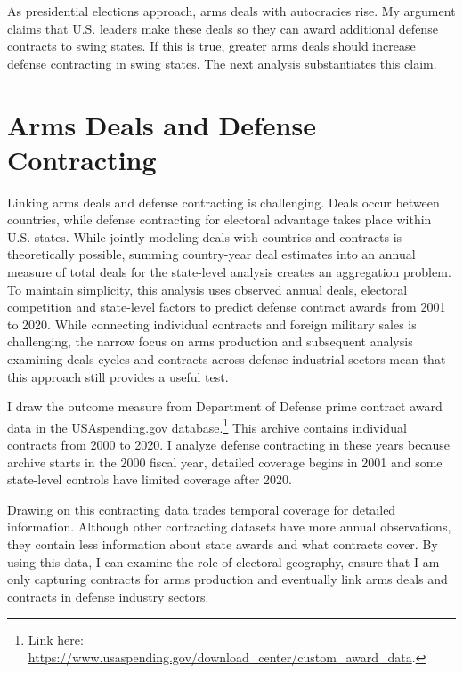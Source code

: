\documentclass[12pt]{article}
\begin{document}
As presidential elections approach, arms deals with autocracies rise. 
My argument claims that U.S. leaders make these deals so they can award additional defense contracts to swing states. 
If this is true, greater arms deals should increase defense contracting in swing states. 
The next analysis substantiates this claim.


\section{Arms Deals and Defense Contracting}


Linking arms deals and defense contracting is challenging. 
Deals occur between countries, while defense contracting for electoral advantage takes place within U.S. states.
While jointly modeling deals with countries and contracts is theoretically possible, summing country-year deal estimates into an annual measure of total deals for the state-level analysis creates an aggregation problem. %
To maintain simplicity, this analysis uses observed annual deals, electoral competition and state-level factors to predict defense contract awards from 2001 to 2020. 
While connecting individual contracts and foreign military sales is challenging, the narrow focus on arms production and subsequent analysis examining deals cycles and contracts across defense industrial sectors mean that this approach still provides a useful test. 



I draw the outcome measure from Department of Defense prime contract award data in the USAspending.gov database.\footnote{Link here: \url{https://www.usaspending.gov/download_center/custom_award_data}.} 
This archive contains individual contracts from 2000 to 2020.
I analyze defense contracting in these years because archive starts in the 2000 fiscal year, detailed coverage begins in 2001 and some state-level controls have limited coverage after 2020.


Drawing on this contracting data trades temporal coverage for detailed information. 
Although other contracting datasets have more annual observations, they contain less information about state awards and what contracts cover. 
By using this data, I can examine the role of electoral geography, ensure that I am only capturing contracts for arms production and eventually link arms deals and contracts in defense industry sectors. 
\end{document}
